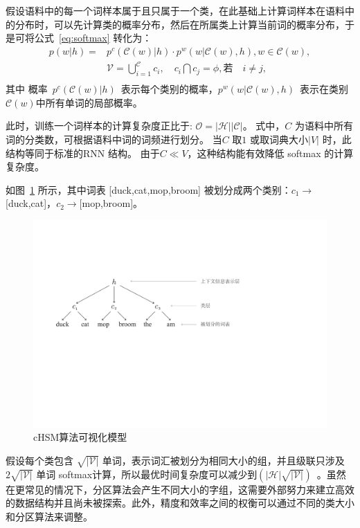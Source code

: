 假设语料中的每一个词样本属于且只属于一个类，在此基础上计算词样本在语料中的分布时，可以先计算类的概率分布，然后在所属类上计算当前词的概率分布，于是可将公式~\ref{eq:softmax} 转化为：
  \begin{equation}
  \begin{split}
p(w|h)=&p^c(\mathcal{C}(w)|h)\cdot p^w(w|\mathcal{C}(w),h) , w\in \mathcal{C}(w),\\
&\mathcal{V}=\bigcup _{i = 1}^\mathcal{C}{c_i},\quad  c_i \bigcap c_j=\phi, \text{若}\quad i\ne j, \\
\end{split}
\end{equation}
其中 概率~$p^c(\mathcal{C}(w)|h)$~表示每个类别的概率，$p^w(w|\mathcal{C}(w),h)$~表示在类别$\mathcal{C}(w)$中所有单词的局部概率。

此时，训练一个词样本的计算复杂度正比于: $\mathcal{O =|H||C|}$。 式中，$C$ 为语料中所有词的分类数，可根据语料中词的词频进行划分。 当$C$ 取$1$ 或取词典大小$|V|$ 时，此结构等同于标准的RNN 结构。 由于$C \ll V$，这种结构能有效降低 softmax 的计算复杂度。

如图~\ref{fig:case_hsm} 所示，其中词表 [duck,cat,mop,broom] 被划分成两个类别：$c_1\to$[duck,cat]，$c_2\to$[mop,broom]。
\begin{figure}[!h]
  \centering
\includegraphics[width=0.7\linewidth]{./figures/case_chsm.pdf}
\caption{cHSM算法可视化模型}\label{fig:case_hsm}
\end{figure}


假设每个类包含 $\sqrt{\mathcal{|V|}}$ 单词，表示词汇被划分为相同大小的组，并且级联只涉及$2\sqrt{\mathcal{|V|}}$ 单词 softmax计算，所以最优时间复杂度可以减少到$(\mathcal{|H|}\sqrt{\mathcal{|V|}})$~。虽然在更常见的情况下，分区算法会产生不同大小的字组，这需要外部努力来建立高效的数据结构并且尚未被探索。此外，精度和效率之间的权衡可以通过不同的类大小和分区算法来调整。

